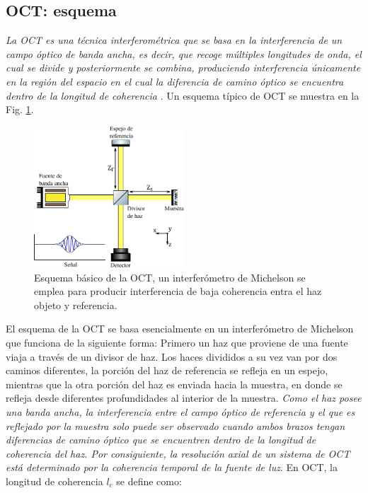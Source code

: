 \subsection{OCT: esquema}
\label{sec:OCT_Esquema}

\emph{La OCT es una técnica interferométrica que se basa en la interferencia de un campo óptico de banda ancha, es decir, que recoge múltiples longitudes de onda, el cual se divide y posteriormente se combina, produciendo interferencia únicamente en la región del espacio en el cual la diferencia de camino óptico se encuentra dentro de la longitud de coherencia} \cite{Fercher}. Un esquema típico de OCT se muestra en la Fig. \ref{fig:OCT_Scheme}. 

\begin{figure}[ht!]
	\centering
	\includegraphics[width = 0.5\textwidth, keepaspectratio]{img/Carlos_oct_Scheme}
	\caption{Esquema básico de la OCT, un interferómetro de Michelson se emplea para producir interferencia de baja coherencia entra el haz objeto y referencia.}
	\label{fig:OCT_Scheme}
\end{figure}

El esquema de la OCT se basa esencialmente en un interferómetro de Michelson que funciona de la siguiente forma: Primero un haz que proviene de una fuente viaja a través de un divisor de haz. Los haces divididos a su vez van por dos caminos diferentes, la porción del haz de referencia se refleja en un espejo, mientras que la otra porción del haz es enviada hacia la muestra, en donde se refleja desde diferentes profundidades al interior de la muestra. \emph{Como el haz posee una banda ancha, la interferencia entre el campo óptico de referencia y el que es reflejado por la muestra solo puede ser observado cuando ambos brazos tengan diferencias de camino óptico que se encuentren dentro de la longitud de coherencia del haz. Por consiguiente, la resolución axial de un sistema de OCT está determinado por la coherencia temporal de la fuente de luz}. En OCT, la longitud de coherencia $l_c$ se define como:

